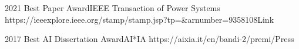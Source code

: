 \begin{awards}
	\awardentry
	{2021}
	{Best Paper Award}{IEEE Transaction of Power Systems}
	{https://ieeexplore.ieee.org/stamp/stamp.jsp?tp=\&arnumber=9358108}{Link}

	\awardentry
	{2017}
	{Best AI Dissertation Award}{AI*IA} %
	{https://aixia.it/en/bandi-2/premi/}{Press}
\end{awards}


